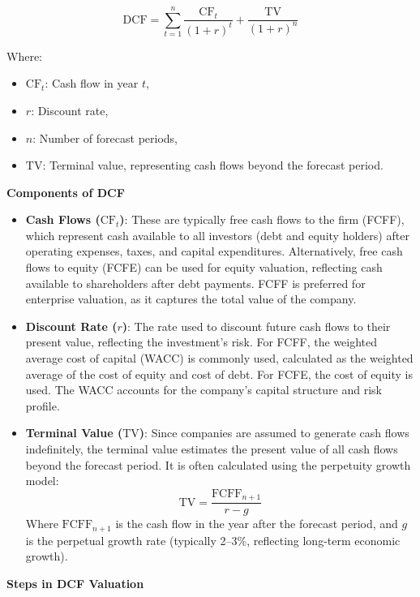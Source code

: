 \documentclass[12pt]{article}
\begin{document}
\[
\text{DCF} = \sum_{t=1}^{n} \frac{\text{CF}_t}{(1 + r)^t} + \frac{\text{TV}}{(1 + r)^n}
\]

Where:
\begin{itemize}
    \item \(\text{CF}_t\): Cash flow in year \(t\),
    \item \(r\): Discount rate,
    \item \(n\): Number of forecast periods,
    \item \(\text{TV}\): Terminal value, representing cash flows beyond the forecast period.
\end{itemize}

\textbf{Components of DCF}

\begin{itemize}
    \item \textbf{Cash Flows (\(\text{CF}_t\))}: These are typically free cash flows to the firm (FCFF), which represent cash available to all investors (debt and equity holders) after operating expenses, taxes, and capital expenditures. Alternatively, free cash flows to equity (FCFE) can be used for equity valuation, reflecting cash available to shareholders after debt payments. FCFF is preferred for enterprise valuation, as it captures the total value of the company.
    \item \textbf{Discount Rate (\(r\))}: The rate used to discount future cash flows to their present value, reflecting the investment's risk. For FCFF, the weighted average cost of capital (WACC) is commonly used, calculated as the weighted average of the cost of equity and cost of debt. For FCFE, the cost of equity is used. The WACC accounts for the company's capital structure and risk profile.
    \item \textbf{Terminal Value (\(\text{TV}\))}: Since companies are assumed to generate cash flows indefinitely, the terminal value estimates the present value of all cash flows beyond the forecast period. It is often calculated using the perpetuity growth model:
    \[
    \text{TV} = \frac{\text{FCFF}_{n+1}}{r - g}
    \]
    Where \(\text{FCFF}_{n+1}\) is the cash flow in the year after the forecast period, and \(g\) is the perpetual growth rate (typically 2–3\%, reflecting long-term economic growth).
\end{itemize}

\textbf{Steps in DCF Valuation}
\end{document}
